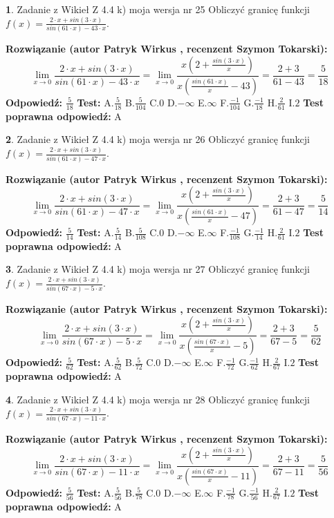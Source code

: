 \documentclass[12pt, a4paper]{article}
\theoremstyle{definition} %
\newtheorem{zad}{}
\newcommand{\zadStart}[1]{\begin{zad}#1\newline}
\newcommand{\zadStop}{\end{zad}}
\newcommand{\rozwStart}[2]{\noindent \textbf{Rozwiązanie (autor #1 , recenzent #2): }\newline}
\newcommand{\rozwStop}{\newline}
\newcommand{\odpStart}{\noindent \textbf{Odpowiedź:}\newline}
\newcommand{\odpStop}{\newline}
\newcommand{\testStart}{\noindent \textbf{Test:}\newline}
\newcommand{\testStop}{\newline}
\newcommand{\kluczStart}{\noindent \textbf{Test poprawna odpowiedź:}\newline}
\newcommand{\kluczStop}{\newline}
\begin{document}
\zadStart{Zadanie z Wikieł Z 4.4 k) moja wersja nr 25}
Obliczyć granicę funkcji $f(x)=\frac{2\cdot x +sin(3\cdot x)}{sin(61\cdot x) -43\cdot x}$.
\zadStop
\rozwStart{Patryk Wirkus}{Szymon Tokarski}
$$\lim\limits_{x\to 0}\frac{2\cdot x +sin(3\cdot x)}{sin(61\cdot x) -43\cdot x}
=\lim\limits_{x\to 0}\frac{x(2+\frac{sin(3\cdot x)}{x})}{x(\frac{sin(61\cdot x)}{x}-43)}
=\frac{2+3}{61-43} = \frac{5}{18}$$
\rozwStop
\odpStart
$\frac{5}{18}$
\odpStop
\testStart
A.$\frac{5}{18}$
B.$\frac{5}{104}$
C.$0$
D.$-\infty$
E.$\infty$
F.$\frac{-1}{104}$
G.$\frac{-1}{18}$
H.$\frac{2}{61}$
I.$2$
\testStop
\kluczStart
A
\kluczStop



\zadStart{Zadanie z Wikieł Z 4.4 k) moja wersja nr 26}
Obliczyć granicę funkcji $f(x)=\frac{2\cdot x +sin(3\cdot x)}{sin(61\cdot x) -47\cdot x}$.
\zadStop
\rozwStart{Patryk Wirkus}{Szymon Tokarski}
$$\lim\limits_{x\to 0}\frac{2\cdot x +sin(3\cdot x)}{sin(61\cdot x) -47\cdot x}
=\lim\limits_{x\to 0}\frac{x(2+\frac{sin(3\cdot x)}{x})}{x(\frac{sin(61\cdot x)}{x}-47)}
=\frac{2+3}{61-47} = \frac{5}{14}$$
\rozwStop
\odpStart
$\frac{5}{14}$
\odpStop
\testStart
A.$\frac{5}{14}$
B.$\frac{5}{108}$
C.$0$
D.$-\infty$
E.$\infty$
F.$\frac{-1}{108}$
G.$\frac{-1}{14}$
H.$\frac{2}{61}$
I.$2$
\testStop
\kluczStart
A
\kluczStop



\zadStart{Zadanie z Wikieł Z 4.4 k) moja wersja nr 27}
Obliczyć granicę funkcji $f(x)=\frac{2\cdot x +sin(3\cdot x)}{sin(67\cdot x) -5\cdot x}$.
\zadStop
\rozwStart{Patryk Wirkus}{Szymon Tokarski}
$$\lim\limits_{x\to 0}\frac{2\cdot x +sin(3\cdot x)}{sin(67\cdot x) -5\cdot x}
=\lim\limits_{x\to 0}\frac{x(2+\frac{sin(3\cdot x)}{x})}{x(\frac{sin(67\cdot x)}{x}-5)}
=\frac{2+3}{67-5} = \frac{5}{62}$$
\rozwStop
\odpStart
$\frac{5}{62}$
\odpStop
\testStart
A.$\frac{5}{62}$
B.$\frac{5}{72}$
C.$0$
D.$-\infty$
E.$\infty$
F.$\frac{-1}{72}$
G.$\frac{-1}{62}$
H.$\frac{2}{67}$
I.$2$
\testStop
\kluczStart
A
\kluczStop



\zadStart{Zadanie z Wikieł Z 4.4 k) moja wersja nr 28}
Obliczyć granicę funkcji $f(x)=\frac{2\cdot x +sin(3\cdot x)}{sin(67\cdot x) -11\cdot x}$.
\zadStop
\rozwStart{Patryk Wirkus}{Szymon Tokarski}
$$\lim\limits_{x\to 0}\frac{2\cdot x +sin(3\cdot x)}{sin(67\cdot x) -11\cdot x}
=\lim\limits_{x\to 0}\frac{x(2+\frac{sin(3\cdot x)}{x})}{x(\frac{sin(67\cdot x)}{x}-11)}
=\frac{2+3}{67-11} = \frac{5}{56}$$
\rozwStop
\odpStart
$\frac{5}{56}$
\odpStop
\testStart
A.$\frac{5}{56}$
B.$\frac{5}{78}$
C.$0$
D.$-\infty$
E.$\infty$
F.$\frac{-1}{78}$
G.$\frac{-1}{56}$
H.$\frac{2}{67}$
I.$2$
\testStop
\kluczStart
A
\kluczStop
\end{document}
